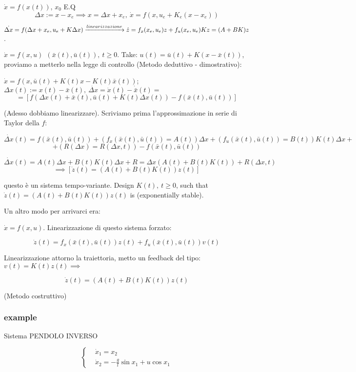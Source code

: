 $\dot{x}=f(x(t))$, $x_0$ E.Q
\[
	\Delta x := x-x_e \implies x = \Delta x + x_e,\ \dot{x}=f(x,u_e+K_e(x-x_e))
\]

$\dot{\Delta x} = f(\Delta x + x_e, u_e + K\Delta x) \tendsto{linearizzazione} \dot{z}= f_x(x_e,u_e)z + f_u(x_e,u_e)Kz = (A+BK)z$. 

$\dot{x}=f(x,u)\ \ (\bar{x}(t), \bar{u}(t)),\ t \geq 0$. Take: $u(t) = \bar{u}(t) + K(x-\bar{x}(t))$, proviamo a metterlo nella legge di controllo (Metodo deduttivo - dimostrativo):

$\dot{x} = f(x,\bar{u}(t) + K(t)x - K(t)\bar{x}(t))$;
$\Delta x(t) := x(t) - \bar{x}(t),\ \dot{\Delta x} = \dot{x}(t) - \dot{\bar{x}}(t) =$
\[
	= [f(\Delta x(t) + \bar{x}(t), \bar{u}(t) + K(t)\Delta x(t)) -  f(\bar{x}(t),\bar{u}(t))]
\]

(Adesso dobbiamo linearizzare). Scriviamo prima l'approssimazione in serie di Taylor della $f$:

\[
	\dot{\Delta x}(t) = f(\bar{x}(t), \bar{u}(t)) + (f_x(\bar{x}(t),\bar{u}(t)) = A(t))\Delta x + (f_u(\bar{x}(t), \bar{u}(t)) = B(t))K(t)\Delta x +
\]
\[
	+ (R(\Delta x) = R(\Delta x, t)) - f(\bar{x}(t),\bar{u}(t))
\]

\[
	\dot{\Delta x}(t) = A(t)\Delta x + B(t)K(t)\Delta x + R = \Delta x(A(t) + B(t)K(t)) + R(\Delta x, t)
\]
\[
	\implies [\dot{z}(t) = (A(t) + B(t)K(t))z(t)]
\]

questo è un sistema tempo-variante. Design $K(t),\ t \geq 0$, such that $\dot{z}(t) = (A(t)+B(t)K(t))z(t)$ is (exponentially stable).

Un altro modo per arrivarci era:

$\dot{x}=f(x,u)$. Linearizzazione di questo sistema forzato:

\[	
	\dot{z}(t) = f_x(\bar{x}(t), \bar{u}(t))z(t) + f_u(\bar{x}(t), \bar{u}(t))v(t) 
\]

Linearizzazione attorno la traiettoria, metto un feedback del tipo: $v(t) = K(t)z(t) \implies$

\[
	\dot{z}(t) = (A(t)+B(t)K(t))z(t)
\]

(Metodo costruttivo)

\subsubsection{example}{Sistema PENDOLO INVERSO}

\[
	\left\{
	\begin{aligned}
	&\dot{x}_1 = x_2 \\
	&\dot{x}_2 = -\frac{g}{l}\sin{x_1} + u\cos{x_1}
	\end{aligned} 
	\right.
\]

